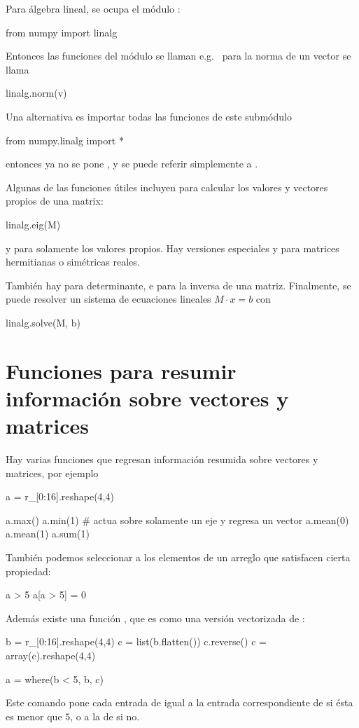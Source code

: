 Para álgebra lineal, se ocupa el módulo :
\begin{python}
from numpy import linalg
\end{python}
Entonces las funciones del módulo se llaman e.g.\  para la norma de un vector se llama
\begin{python}
linalg.norm(v)
\end{python}
Una alternativa es importar todas las funciones de este submódulo
\begin{python}
from numpy.linalg import *
\end{python}
entonces ya no se pone , y se puede referir simplemente a .

Algunas de las funciones útiles incluyen  para calcular los valores y vectores propios de una matrix:
\begin{python}
linalg.eig(M)
\end{python}
y  para solamente los valores propios. Hay versiones especiales  y  para matrices hermitianas o simétricas reales.

También hay  para determinante, e  para la inversa de una matriz.
Finalmente, se puede resolver un sistema de ecuaciones lineales $M \cdot x = b$ con
\begin{python}
linalg.solve(M, b)
\end{python}

\section{Funciones para resumir información sobre vectores y matrices}
Hay varias funciones que regresan información resumida sobre vectores y matrices, por ejemplo
\begin{python}
a = r_[0:16].reshape(4,4)

a.max()
a.min(1)	# actua sobre solamente un eje y regresa un vector
a.mean(0)  	
a.mean(1)
a.sum(1)
\end{python}

También podemos seleccionar a los elementos de un arreglo que satisfacen cierta propiedad:
\begin{python}
a > 5
a[a > 5] = 0
\end{python}

Además existe una función , que es como una versión vectorizada de :
\begin{python}
b = r_[0:16].reshape(4,4)
c = list(b.flatten())
c.reverse()
c = array(c).reshape(4,4)

a = where(b < 5, b, c)
\end{python}
Este comando pone cada entrada de  igual a la entrada correspondiente de  si ésta es menor que $5$, o a la de  si no.







